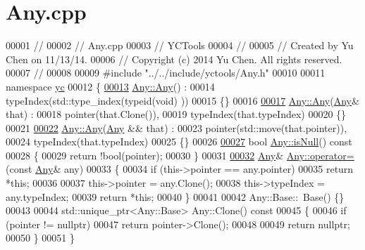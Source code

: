 \hypertarget{_any_8cpp_source}{}\section{Any.\+cpp}
\label{_any_8cpp_source}

\begin{DoxyCode}
00001 \textcolor{comment}{//}
00002 \textcolor{comment}{//  Any.cpp}
00003 \textcolor{comment}{//  YCTools}
00004 \textcolor{comment}{//}
00005 \textcolor{comment}{//  Created by Yu Chen on 11/13/14.}
00006 \textcolor{comment}{//  Copyright (c) 2014 Yu Chen. All rights reserved.}
00007 \textcolor{comment}{//}
00008 
00009 \textcolor{preprocessor}{#include "../../include/yctools/Any.h"}
00010 
00011 \textcolor{keyword}{namespace }\hyperlink{namespaceyc}{yc}
00012 \{
\hypertarget{_any_8cpp_source_l00013}{}\hyperlink{classyc_1_1_any_ad8fcf7b262813c063a49dfc91a88e771}{00013}     \hyperlink{classyc_1_1_any_ad8fcf7b262813c063a49dfc91a88e771}{Any::Any}() :
00014     typeIndex(std::type\_index(typeid(void) ))
00015     \{\}
00016     
\hypertarget{_any_8cpp_source_l00017}{}\hyperlink{classyc_1_1_any_a30faf7a0b6018dc259853ee153112003}{00017}     \hyperlink{classyc_1_1_any_ad8fcf7b262813c063a49dfc91a88e771}{Any::Any}(\hyperlink{classyc_1_1_any}{Any}& that) :
00018     pointer(that.Clone()),
00019     typeIndex(that.typeIndex)
00020     \{\}
00021     
\hypertarget{_any_8cpp_source_l00022}{}\hyperlink{classyc_1_1_any_a42a1478072e69e4bcdb1e3b46cb0a270}{00022}     \hyperlink{classyc_1_1_any_ad8fcf7b262813c063a49dfc91a88e771}{Any::Any}(\hyperlink{classyc_1_1_any}{Any} && that) :
00023     pointer(std::move(that.pointer)),
00024     typeIndex(that.typeIndex)
00025     \{\}
00026     
\hypertarget{_any_8cpp_source_l00027}{}\hyperlink{classyc_1_1_any_aceb067996f86a6a6b3a15f5c7f4bf3c8}{00027}     \textcolor{keywordtype}{bool} \hyperlink{classyc_1_1_any_aceb067996f86a6a6b3a15f5c7f4bf3c8}{Any::isNull}()\textcolor{keyword}{ const}
00028 \textcolor{keyword}{    }\{
00029         \textcolor{keywordflow}{return} !bool(pointer);
00030     \}
00031     
\hypertarget{_any_8cpp_source_l00032}{}\hyperlink{classyc_1_1_any_a52a7e3379867190ca9da0554d9323853}{00032}     \hyperlink{classyc_1_1_any}{Any}& \hyperlink{classyc_1_1_any_a52a7e3379867190ca9da0554d9323853}{Any::operator=}(\textcolor{keyword}{const} \hyperlink{classyc_1_1_any}{Any}& any)
00033     \{
00034         \textcolor{keywordflow}{if} (this->pointer == any.pointer)
00035             \textcolor{keywordflow}{return} *\textcolor{keyword}{this};
00036         
00037         this->pointer = any.Clone();
00038         this->typeIndex = any.typeIndex;
00039         \textcolor{keywordflow}{return} *\textcolor{keyword}{this};
00040     \}
00041     
00042     Any::Base::~Base() \{\}
00043     
00044     std::unique\_ptr<Any::Base> Any::Clone()\textcolor{keyword}{ const}
00045 \textcolor{keyword}{    }\{
00046         \textcolor{keywordflow}{if} (pointer != \textcolor{keyword}{nullptr})
00047             \textcolor{keywordflow}{return} pointer->Clone();
00048         
00049         \textcolor{keywordflow}{return} \textcolor{keyword}{nullptr};
00050     \}
00051 \}
\end{DoxyCode}
